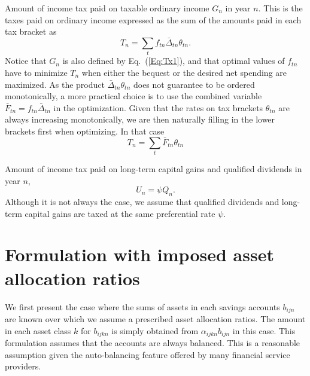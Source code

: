 \documentclass{report}[fleqn,12pt]
\begin{document}
\begin{description}[leftmargin=4em,style=multiline]
\item [$T_n$]
	Amount of income tax paid on taxable ordinary income $G_n$ in year $n$.
	This is the taxes paid on ordinary income expressed as the sum of the amounts
	paid in each tax bracket as
	\begin{equation}
		\label{Eq:IncTax0}
		T_n = \sum_t f_{tn}\bar{\Delta}_{tn}\theta_{tn}.
	\end{equation}
	Notice that $G_n$ is also defined by Eq.~(\ref{Eq:Tx1}), and that optimal
	values of $f_{tn}$ have to
	minimize $T_n$ when either the bequest or the desired net spending are maximized.
	As the product $\bar{\Delta}_{tn}\theta_{tn}$ does not guarantee to
	be ordered monotonically, a more practical choice is to use the combined variable
	$\bar{F}_{tn} = f_{tn}\bar{\Delta}_{tn}$ in the optimization. Given that the rates on
	tax brackets $\theta_{tn}$ are always increasing monotonically, we are then naturally
	filling in the lower brackets first when optimizing. In that case
	\begin{equation}
		\label{Eq:IncTax1}
		T_n = \sum_t \bar{F}_{tn} \theta_{tn}
	\end{equation}

\item [$U_n$]
	Amount of income tax paid on long-term capital gains and qualified dividends in year $n$,
	\begin{equation}
		U_n = \psi Q_n.
	\end{equation}
	Although it is not always the case, we assume that qualified dividends and long-term
	capital gains are taxed at the same preferential rate $\psi$.

\end{description}

\chapter{Formulation with imposed asset allocation ratios}
We first present the case where the sums of assets in each savings accounts $b_{ijn}$ are known
over which we assume a prescribed asset allocation ratios.
The amount in each asset class $k$ for $b_{ijkn}$ is simply obtained
from $\alpha_{ijkn} b_{ijn}$ in this case.
This formulation assumes that the accounts are always balanced. This is
a reasonable assumption given the auto-balancing feature offered by many financial service
providers.
\end{document}

